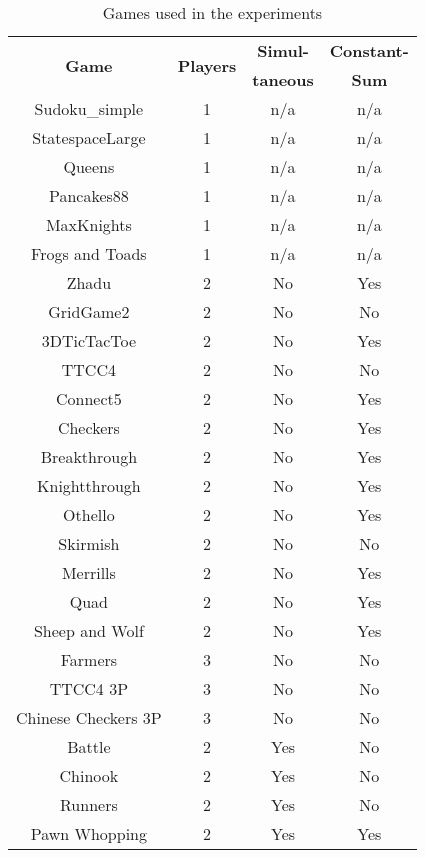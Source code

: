 \documentclass[journal]{IEEEtran}
\begin{document}
\begin{table}[h]
\caption{Games used in the experiments}
\footnotesize
\label{table:games}
\centering
\begin{tabular}{|c|c|c|c|}

\hline
 \multirow{2}{*}{\textbf{Game}} & \multirow{2}{*}{\textbf{Players}} & \textbf{Simul-} & \textbf{Constant-} \\
  & & \textbf{\textbf{taneous}} & \textbf{Sum}  \\
\hline\hline
Sudoku\_simple & 1 & n/a & n/a   \\ \hline
StatespaceLarge & 1 & n/a & n/a  \\ \hline
Queens & 1 & n/a & n/a   \\ \hline
Pancakes88 & 1 & n/a  & n/a   \\ \hline
MaxKnights & 1 & n/a & n/a   \\ \hline
Frogs and Toads & 1 &n/a & n/a   \\ \hline
\hline
Zhadu & 2 & No & Yes   \\ \hline
GridGame2 & 2 & No & No    \\ \hline
3DTicTacToe & 2 & No & Yes     \\ \hline
TTCC4 & 2 & No & No   \\ \hline
Connect5 & 2 & No & Yes     \\ \hline
Checkers & 2 & No & Yes     \\ \hline
Breakthrough & 2 & No & Yes    \\ \hline
Knightthrough & 2 & No & Yes  \\ \hline
Othello & 2 & No & Yes     \\ \hline
Skirmish & 2 & No & No    \\ \hline
Merrills & 2 & No & Yes    \\ \hline
Quad & 2 & No & Yes     \\ \hline
Sheep and Wolf & 2 & No & Yes     \\ \hline
\hline
Farmers & 3 & No & No     \\ \hline
TTCC4 3P & 3 & No & No     \\ \hline
Chinese Checkers 3P & 3 & No & No \\ \hline
\hline
Battle & 2  & Yes  & No      \\ \hline
Chinook & 2  & Yes  & No    \\ \hline
Runners & 2  & Yes &  No   \\ \hline
Pawn Whopping & 2  & Yes  & Yes  \\ \hline
\end{tabular}
\end{table}
\end{document}
